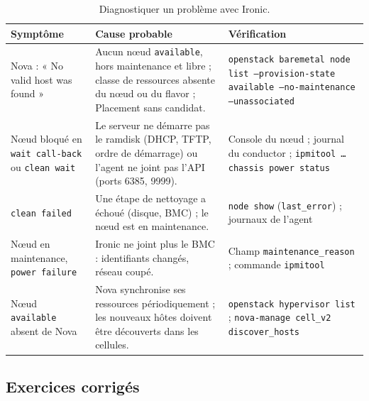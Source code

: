 \begin{table}[!ht]
\centering
\renewcommand{\arraystretch}{1.3}
\begin{tabular}{@{}>{\raggedright\arraybackslash}p{3.6cm}>{\raggedright\arraybackslash}p{6.6cm}>{\raggedright\arraybackslash}p{5.3cm}@{}}
\toprule
\textbf{Symptôme} & \textbf{Cause probable} & \textbf{Vérification} \\
\midrule
Nova : « No valid host was found » & Aucun nœud \texttt{available}, hors maintenance et libre ; classe de ressources absente du nœud ou du flavor ; Placement sans candidat. & \texttt{openstack baremetal node list --provision-state available --no-maintenance --unassociated} \\
Nœud bloqué en \texttt{wait call-back} ou \texttt{clean wait} & Le serveur ne démarre pas le ramdisk (DHCP, TFTP, ordre de démarrage) ou l'agent ne joint pas l'API (ports 6385, 9999). & Console du nœud ; journal du conductor ; \texttt{ipmitool \dots{} chassis power status} \\
\texttt{clean failed} & Une étape de nettoyage a échoué (disque, BMC) ; le nœud est en maintenance. & \texttt{node show} (\texttt{last\_\allowbreak error}) ; journaux de l'agent \\
Nœud en maintenance, \texttt{power failure} & Ironic ne joint plus le BMC : identifiants changés, réseau coupé. & Champ \texttt{maintenance\_\allowbreak reason} ; commande \texttt{ipmitool} \\
Nœud \texttt{available} absent de Nova & Nova synchronise ses ressources périodiquement ; les nouveaux hôtes doivent être découverts dans les cellules. & \texttt{openstack hypervisor list} ; \texttt{nova-manage cell\_\allowbreak v2 discover\_\allowbreak hosts} \\
\bottomrule
\end{tabular}
\caption{Diagnostiquer un problème avec Ironic.}
\label{tab:ir-pannes}
\end{table}

\clearpage
\subsection{Exercices corrigés}\label{sec:ir-exercices}

